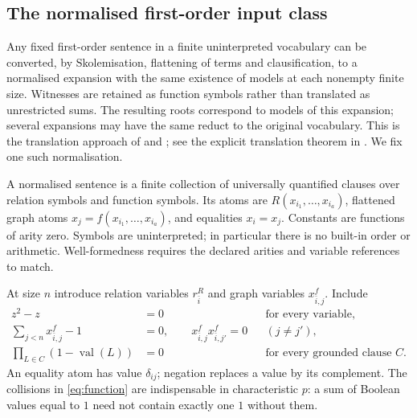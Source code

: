 \subsection{The normalised first-order input class}
Any fixed first-order sentence in a finite uninterpreted vocabulary can
be converted, by Skolemisation, flattening of terms and clausification,
to a normalised expansion with the same existence of models at each
nonempty finite size. Witnesses are retained as function symbols rather
than translated as unrestricted sums. The resulting roots correspond
to models of this expansion; several expansions may have the same
reduct to the original vocabulary. This is the translation approach of
\cite[Section~1.2]{Riis}\cite[Section~1.2]{RiisLong} and
\cite{RiisSitharamTautologies}; see the explicit translation theorem in
\cite[Section~II, Theorem~1]{RiisSitharamTranslationPreprint}.
We fix one such normalisation.

A normalised sentence is a finite collection of universally quantified clauses over relation symbols and function symbols. Its atoms are $R(x_{i_1},\ldots,x_{i_a})$, flattened graph atoms $x_j=f(x_{i_1},\ldots,x_{i_a})$, and equalities $x_i=x_j$. Constants are functions of arity zero. Symbols are uninterpreted; in particular there is no built-in order or arithmetic. Well-formedness requires the declared arities and variable references to match.

At size $n$ introduce relation variables $r^R_{\bar i}$ and graph variables $x^f_{\bar i,j}$. Include
\begin{align}
 z^2-z&=0 &&\text{for every variable},\label{eq:boolean}\\
 \sum_{j<n}x^f_{\bar i,j}-1&=0,\qquad
 x^f_{\bar i,j}x^f_{\bar i,j'}=0 &&(j\ne j'),\label{eq:function}\\
 \prod_{L\in C}(1-\operatorname{val}(L))&=0 &&\text{for every grounded clause }C.\label{eq:clause}
\end{align}
An equality atom has value $\delta_{ij}$; negation replaces a value by its complement. The collisions in \eqref{eq:function} are indispensable in characteristic $p$: a sum of Boolean values equal to $1$ need not contain exactly one $1$ without them.


